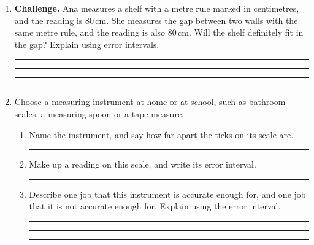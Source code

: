\documentclass[11pt,a4paper]{article}
\newcommand{\wline}{\par\vspace{15pt}\noindent\rule{\linewidth}{0.4pt}}
\begin{document}
\begin{enumerate}[resume]
\begin{minipage}[t]{0.68\linewidth}
\medskip
Explain how you chose the gap between the ticks.
\wline\wline
\end{minipage}\hfill
\begin{minipage}[t]{0.27\linewidth}
\centering
{}
\end{minipage}

\item \textbf{Challenge.} Ana measures a shelf with a metre rule marked in
centimetres, and the reading is 80\,cm. She measures the gap between two walls
with the same metre rule, and the reading is also 80\,cm. Will the shelf
definitely fit in the gap? Explain using error intervals.
\wline\wline\wline\wline

\item Choose a measuring instrument at home or at school, such as bathroom
scales, a measuring spoon or a tape measure.
\begin{enumerate}
\item Name the instrument, and say how far apart the ticks on its scale are.
\wline
\item Make up a reading on this scale, and write its error interval.
\wline
\item Describe one job that this instrument is accurate enough for, and one
job that it is not accurate enough for. Explain using the error interval.
\wline\wline\wline
\end{enumerate}
\end{enumerate}
\end{document}
